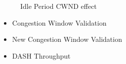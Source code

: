 \documentclass[10pt,sigconf]{acmart}
\begin{document}

\begin{figure*}
    \centering
    \caption{Idle Period CWND effect}
    \label{fig:idle_effect}
\end{figure*}

\begin{itemize}
    \item Congestion Window Validation
    \item New Congestion Window Validation
    \item DASH Throughput
\end{itemize}




















\end{document}
